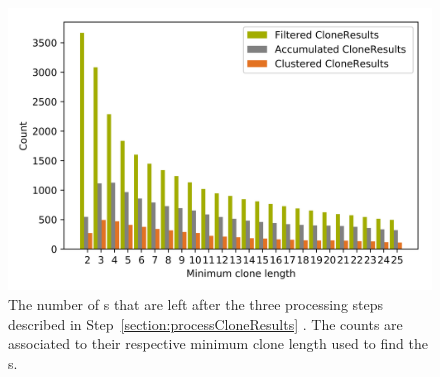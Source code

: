 
\begin{figure}
	\centering
	\includegraphics[width=0.8\linewidth]{figures/Thresholds/processed.png}
	\caption[Processed CloneResults in relation to the minimum clone length]{
		The number of
		 s
		  that are left after the three processing steps described in
		   Step~\ref{section:processCloneResults}
		   . The counts are associated to their respective minimum clone length used to find the 
		   s.
	}
	\label{fig:thresholdsProcessed}
\end{figure}
